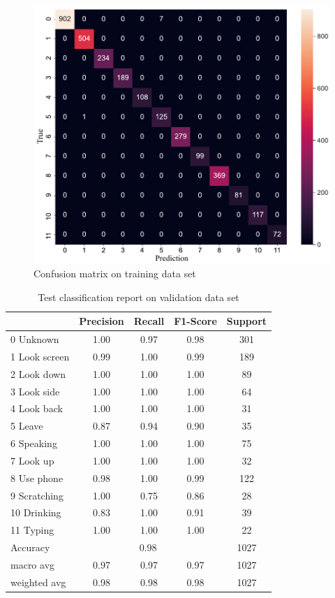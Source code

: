 \begin{figure}[H]
    \centering
    \includegraphics[width=.74\textwidth]{evaluation/imgs/5-confusion_matrix_train.pdf}
    \caption{Confusion matrix on training data set}
    \label{fig:5-confusion_matrix_train}
\end{figure}

\begin{table}[!htbp]
\centering
\begin{tabular}{|l|c|c|c|c|}
\hline
              & Precision & Recall & F1-Score & Support \\ \hline
0 Unknown     & 1.00      & 0.97   & 0.98     & 301     \\ \hline
1 Look screen & 0.99      & 1.00   & 0.99     & 189     \\ \hline
2 Look down   & 1.00      & 1.00   & 1.00     & 89      \\ \hline
3 Look side   & 1.00      & 1.00   & 1.00     & 64      \\ \hline
4 Look back   & 1.00      & 1.00   & 1.00     & 31      \\ \hline
5 Leave       & 0.87      & 0.94   & 0.90     & 35      \\ \hline
6 Speaking    & 1.00      & 1.00   & 1.00     & 75      \\ \hline
7 Look up     & 1.00      & 1.00   & 1.00     & 32      \\ \hline
8 Use phone   & 0.98      & 1.00   & 0.99     & 122     \\ \hline
9 Scratching  & 1.00      & 0.75   & 0.86     & 28      \\ \hline
10 Drinking   & 0.83      & 1.00   & 0.91     & 39      \\ \hline
11 Typing     & 1.00      & 1.00   & 1.00     & 22      \\ \hline
Accuracy      & \multicolumn{3}{c|}{0.98}     & 1027    \\ \hline
macro avg     & 0.97      & 0.97   & 0.97     & 1027    \\ \hline
weighted avg  & 0.98      & 0.98   & 0.98     & 1027    \\ \hline
\end{tabular}
\caption{Test classification report on validation data set}
\label{tab:Test classification report}
\end{table}

